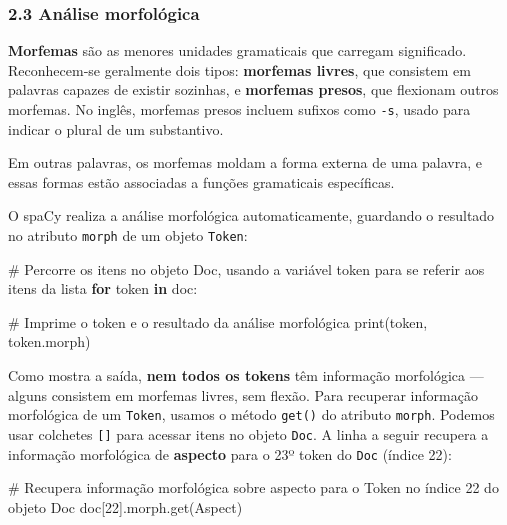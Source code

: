 \documentclass[
  brazilian,
  11pt,
]{article}
\newenvironment{Shaded}{\begin{snugshade}}{\end{snugshade}}
\newcommand{\BuiltInTok}[1]{\textcolor[rgb]{0.50,0.55,0.55}{#1}}
\newcommand{\CommentTok}[1]{\textcolor[rgb]{0.48,0.49,0.49}{#1}}
\newcommand{\ControlFlowTok}[1]{\textcolor[rgb]{0.99,0.74,0.29}{\textbf{#1}}}
\newcommand{\DecValTok}[1]{\textcolor[rgb]{0.96,0.45,0.00}{#1}}
\newcommand{\KeywordTok}[1]{\textcolor[rgb]{0.81,0.81,0.76}{\textbf{#1}}}
\newcommand{\NormalTok}[1]{\textcolor[rgb]{0.81,0.81,0.76}{#1}}
\newcommand{\StringTok}[1]{\textcolor[rgb]{0.96,0.31,0.31}{#1}}
\let\oldtexttt\texttt
\renewcommand{\texttt}[1]{{\color{inlink}\oldtexttt{#1}}}
\begin{document}
\subsubsection{2.3 Análise morfológica}\label{anuxe1lise-morfoluxf3gica}

\textbf{Morfemas} são as menores unidades gramaticais que carregam
significado. Reconhecem‑se geralmente dois tipos: \textbf{morfemas
livres}, que consistem em palavras capazes de existir sozinhas, e
\textbf{morfemas presos}, que flexionam outros morfemas. No inglês,
morfemas presos incluem sufixos como \texttt{-s}, usado para indicar o
plural de um substantivo.

Em outras palavras, os morfemas moldam a forma externa de uma palavra, e
essas formas estão associadas a funções gramaticais específicas.

O spaCy realiza a análise morfológica automaticamente, guardando o
resultado no atributo \texttt{morph} de um objeto \texttt{Token}:

\begin{Shaded}
\begin{Highlighting}[]
\CommentTok{\# Percorre os itens no objeto Doc, usando a variável \textquotesingle{}token\textquotesingle{} para se referir aos itens da lista}
\ControlFlowTok{for}\NormalTok{ token }\KeywordTok{in}\NormalTok{ doc:}

    \CommentTok{\# Imprime o token e o resultado da análise morfológica}
    \BuiltInTok{print}\NormalTok{(token, token.morph)}
\end{Highlighting}
\end{Shaded}

Como mostra a saída, \textbf{nem todos os tokens} têm informação
morfológica --- alguns consistem em morfemas livres, sem flexão. Para
recuperar informação morfológica de um \texttt{Token}, usamos o método
\texttt{get()} do atributo \texttt{morph}. Podemos usar colchetes
\texttt{{[}{]}} para acessar itens no objeto \texttt{Doc}. A linha a
seguir recupera a informação morfológica de \textbf{aspecto} para o 23º
token do \texttt{Doc} (índice 22):

\begin{Shaded}
\begin{Highlighting}[]
\CommentTok{\# Recupera informação morfológica sobre aspecto para o Token no índice 22 do objeto Doc}
\NormalTok{doc[}\DecValTok{22}\NormalTok{].morph.get(}\StringTok{\textquotesingle{}Aspect\textquotesingle{}}\NormalTok{)}
\end{Highlighting}
\end{Shaded}
\end{document}

